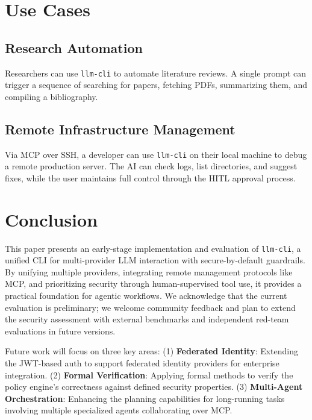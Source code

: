 \documentclass[conference]{IEEEtran}
\begin{document}
\section{Use Cases}

\subsection{Research Automation}
Researchers can use \texttt{llm-cli} to automate literature reviews. A single prompt can trigger a sequence of searching for papers, fetching PDFs, summarizing them, and compiling a bibliography.

\subsection{Remote Infrastructure Management}
Via MCP over SSH, a developer can use \texttt{llm-cli} on their local machine to debug a remote production server. The AI can check logs, list directories, and suggest fixes, while the user maintains full control through the HITL approval process.

\section{Conclusion}
This paper presents an early-stage implementation and evaluation of \texttt{llm-cli}, a unified CLI for multi-provider LLM interaction with secure-by-default guardrails. By unifying multiple providers, integrating remote management protocols like MCP, and prioritizing security through human-supervised tool use, it provides a practical foundation for agentic workflows. We acknowledge that the current evaluation is preliminary; we welcome community feedback and plan to extend the security assessment with external benchmarks and independent red-team evaluations in future versions.

Future work will focus on three key areas: (1) \textbf{Federated Identity}: Extending the JWT-based auth to support federated identity providers for enterprise integration. (2) \textbf{Formal Verification}: Applying formal methods to verify the policy engine's correctness against defined security properties. (3) \textbf{Multi-Agent Orchestration}: Enhancing the planning capabilities for long-running tasks involving multiple specialized agents collaborating over MCP.
\end{document}
